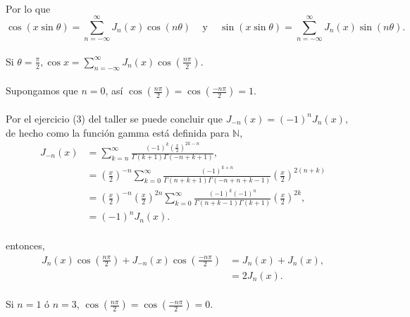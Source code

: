 \documentclass{article}
\begin{document}
\paragraph{}Por lo que
\begin{equation}
	\cos{(x\sin{\theta})} = \sum_{n=-\infty}^{\infty} J_n(x)\cos{(n\theta)} \hspace{10pt} \text{ y } \hspace{10pt} \sin{(x\sin{\theta})} = \sum_{n=-\infty}^{\infty} J_n(x)\sin{(n\theta)}\label{eq:prop_4a2}.
\end{equation}
\paragraph{}Si $\theta = \frac{\pi}{2}, \cos{x} = \sum_{n=-\infty}^{\infty}J_n(x)\cos{\left(\frac{n\pi}{2}\right)}.$
\paragraph{}Supongamos que $n=0$, así $\cos{\left(\frac{n\pi}{2}\right)} =\cos{\left(\frac{-n\pi}{2}\right)} = 1$.
\paragraph{} Por el ejercicio (3) del taller se puede concluir que $J_{-n}(x) = (-1)^n J_n(x),$ de hecho como la función gamma está definida para $\mathbb{N}$,
\begin{align*}
J_{-n}(x) &= \sum_{k=n}^{\infty} \frac{(-1)^k \left(\frac{x}{2}\right)^{2k -n}}{\Gamma(k+1) \Gamma(-n+k+1)},\\
&= \left(\frac{x}{2}\right)^{-n} \sum_{k=0}^{\infty} \frac{(-1)^{k+n}}{\Gamma(n+k+1)\Gamma(-n+n+k-1)} \left(\frac{x}{2}\right)^{2(n+k)}\\
&= \left(\frac{x}{2}\right)^{-n} \left(\frac{x}{2}\right)^{2n} \sum_{k=0}^{\infty} \frac{(-1)^k(-1)^n}{\Gamma(n+k-1)\Gamma(k+1)} \left(\frac{x}{2}\right)^{2k},\\
&= (-1)^{n}J_n(x).
\end{align*}
\paragraph{} entonces,
\begin{align*}
J_n(x)\cos{\left(\frac{n\pi}{2}\right)} + J_{-n}(x) \cos{\left(\frac{-n\pi}{2}\right)} &= J_n(x) + J_n(x),\\
&= 2J_n(x). 
\end{align*}
\paragraph{}Si $n=1$ ó $n=3$, $\cos{\left(\frac{n\pi}{2}\right)} = \cos{\left(\frac{-n\pi}{2}\right)} = 0$.
\end{document}
